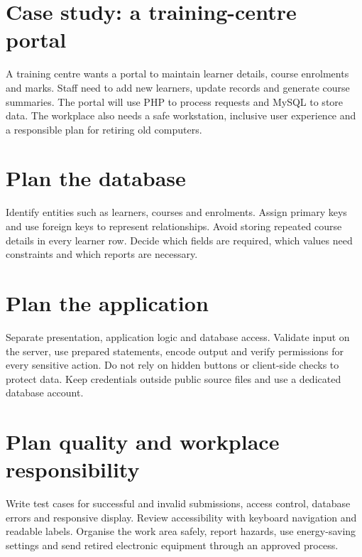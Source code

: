 \documentclass[11pt,openany,oneside]{book}
\begin{document}
\section{Case study: a training-centre portal}
A training centre wants a portal to maintain learner details, course enrolments and marks. Staff need to add new learners, update records and generate course summaries. The portal will use PHP to process requests and MySQL to store data. The workplace also needs a safe workstation, inclusive user experience and a responsible plan for retiring old computers.

\section{Plan the database}
Identify entities such as learners, courses and enrolments. Assign primary keys and use foreign keys to represent relationships. Avoid storing repeated course details in every learner row. Decide which fields are required, which values need constraints and which reports are necessary.

\section{Plan the application}
Separate presentation, application logic and database access. Validate input on the server, use prepared statements, encode output and verify permissions for every sensitive action. Do not rely on hidden buttons or client-side checks to protect data. Keep credentials outside public source files and use a dedicated database account.

\section{Plan quality and workplace responsibility}
Write test cases for successful and invalid submissions, access control, database errors and responsive display. Review accessibility with keyboard navigation and readable labels. Organise the work area safely, report hazards, use energy-saving settings and send retired electronic equipment through an approved process.
\end{document}
